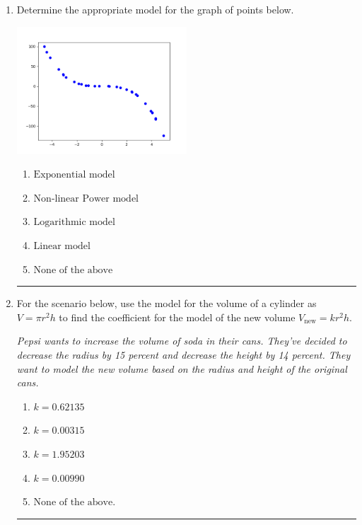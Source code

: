 \documentclass[14pt]{extbook}
\newcommand{\litem}[1]{\item#1\hspace*{-1cm}\rule{\textwidth}{0.4pt}}
\begin{document}
\begin{enumerate}
{\begin{enumerate}[label=\Alph*.]
\end{enumerate} }
\litem{
Determine the appropriate model for the graph of points below.
\begin{center}
    \includegraphics[width=0.5\textwidth]{../Figures/identifyModelGraph12CopyC.png}
\end{center}
\begin{enumerate}[label=\Alph*.]
\item \( \text{Exponential model} \)
\item \( \text{Non-linear Power model} \)
\item \( \text{Logarithmic model} \)
\item \( \text{Linear model} \)
\item \( \text{None of the above} \)

\end{enumerate} }
\litem{
For the scenario below, use the model for the volume of a cylinder as $V = \pi r^2 h$ to find the coefficient for the model of the new volume $V_{\text{new}} = k r^2 h$.
\begin{center}
    \textit{ Pepsi wants to increase the volume of soda in their cans. They've decided to decrease the radius by 15 percent and decrease the height by 14 percent. They want to model the new volume based on the radius and height of the original cans. }
\end{center}
\begin{enumerate}[label=\Alph*.]
\item \( k = 0.62135 \)
\item \( k = 0.00315 \)
\item \( k = 1.95203 \)
\item \( k = 0.00990 \)
\item \( \text{None of the above.} \)

\end{enumerate} }
\end{enumerate}
\end{document}
